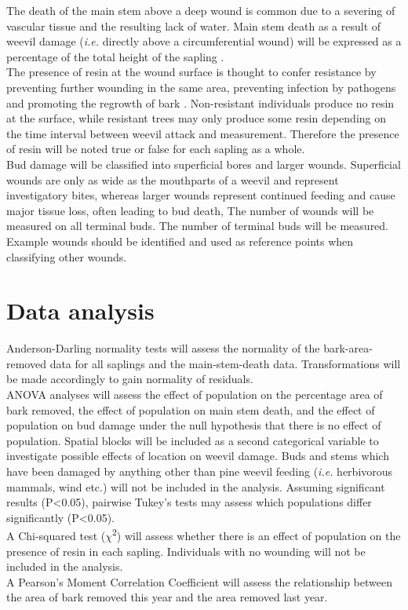 \documentclass[a4paper,12pt,]{article}
\begin{document}
The death of the main stem above a deep wound is common due to a severing of vascular tissue and the resulting lack of water. Main stem death as a result of weevil damage (\textit{i.e.} directly above a circumferential wound) will be expressed as a percentage of the total height of the sapling \citep{Zas2005}.
\\[0.3cm]
The presence of resin at the wound surface is thought to confer resistance by preventing further wounding in the same area, preventing infection by pathogens and promoting the regrowth of bark \citep{Wainhouse2007}. Non-resistant individuals produce no resin at the surface, while resistant trees may only produce some resin depending on the time interval between weevil attack and measurement. Therefore the presence of resin will be noted true or false for each sapling as a whole.
\\[0.3cm]
Bud damage will be classified into superficial bores and larger wounds. Superficial wounds are only as wide as the mouthparts of a weevil and represent investigatory bites, whereas larger wounds represent continued feeding and cause major tissue loss, often leading to bud death, The number of wounds will be measured on all terminal buds. The number of terminal buds will be measured. Example wounds should be identified and used as reference points when classifying other wounds.
\\
\section*{\large{Data analysis}}
Anderson-Darling normality tests will assess the normality of the bark-area-removed data for all saplings and the main-stem-death data. Transformations will be made accordingly to gain normality of residuals. 
\\[0.3cm]
ANOVA analyses will assess the effect of population on the percentage area of bark removed, the effect of population on main stem death, and the effect of population on bud damage under the null hypothesis that there is no effect of population. Spatial blocks will be included as a second categorical variable to investigate possible effects of location on weevil damage. Buds and stems which have been damaged by anything other than pine weevil feeding (\textit{i.e.} herbivorous mammals, wind etc.) will not be included in the analysis. Assuming significant results (P\textless0.05), pairwise Tukey's tests may assess which populations differ significantly (P\textless0.05). 
\\[0.3cm]
A Chi-squared test ($\chi$\textsuperscript{2}) will assess whether there is an effect of population on the presence of resin in each sapling. Individuals with no wounding will not be included in the analysis.
\\[0.3cm]
A Pearson's Moment Correlation Coefficient will assess the relationship between the area of bark removed this year and the area removed last year.
\footnotesize{}
\end{document}
